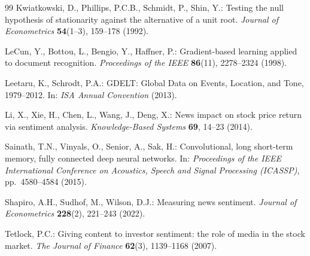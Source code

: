 \documentclass[11pt,a4paper]{article}
\begin{document}
\begin{thebibliography}{99}
Kwiatkowski, D., Phillips, P.C.B., Schmidt, P., Shin, Y.: Testing the null hypothesis of stationarity against the alternative of a unit root. \emph{Journal of Econometrics} \textbf{54}(1--3), 159--178 (1992).

LeCun, Y., Bottou, L., Bengio, Y., Haffner, P.: Gradient-based learning applied to document recognition. \emph{Proceedings of the IEEE} \textbf{86}(11), 2278--2324 (1998).

Leetaru, K., Schrodt, P.A.: GDELT: Global Data on Events, Location, and Tone, 1979--2012. In: \emph{ISA Annual Convention} (2013).

Li, X., Xie, H., Chen, L., Wang, J., Deng, X.: News impact on stock price return via sentiment analysis. \emph{Knowledge-Based Systems} \textbf{69}, 14--23 (2014).

Sainath, T.N., Vinyals, O., Senior, A., Sak, H.: Convolutional, long short-term memory, fully connected deep neural networks. In: \emph{Proceedings of the IEEE International Conference on Acoustics, Speech and Signal Processing (ICASSP)}, pp.\ 4580--4584 (2015).

Shapiro, A.H., Sudhof, M., Wilson, D.J.: Measuring news sentiment. \emph{Journal of Econometrics} \textbf{228}(2), 221--243 (2022).

Tetlock, P.C.: Giving content to investor sentiment: the role of media in the stock market. \emph{The Journal of Finance} \textbf{62}(3), 1139--1168 (2007).

\end{thebibliography}
\end{document}
